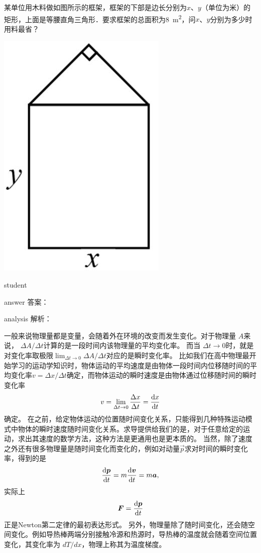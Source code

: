 \begin{example}
	某单位用木料做如图所示的框架，框架的下部是边长分别为$ x $、$ y $（单位为米）的矩形，上面是等腰直角三角形．要求框架的总面积为\SI{8}{m^2}，问$ x $、$ y $分别为多少时用料最省？
		\begin{flushright}
			\includegraphics[width=0.2\linewidth]{image/kinamatics-8.png}
		\end{flushright}
	
	\begin{taggedblock}{student}
		\vspace*{0cm}
	\end{taggedblock}
	
	
	\begin{taggedblock}{answer}
		答案：
	\end{taggedblock}
	
	
	\begin{taggedblock}{analysis}
		解析：
	\end{taggedblock}
\end{example}

一般来说物理量都是变量，会随着外在环境的改变而发生变化。对于物理量 $ A $来说， $ \Delta A/\Delta t $计算的是一段时间内该物理量的平均变化率。
而当 $ \Delta t\rightarrow 0 $时，就是对变化率取极限$ \lim_{\Delta t\rightarrow 0} \Delta A/\Delta t  $对应的是瞬时变化率。
比如我们在高中物理最开始学习的运动学知识时，物体运动的平均速度是由物体一段时间内位移随时间的平均变化率$ v=\Delta x/\Delta t $确定，而物体运动的瞬时速度是由物体通过位移随时间的瞬时变化率
\[
v = \lim_{\Delta t\rightarrow 0}\frac{\Delta x}{\Delta t} = \dv{x}{t}
\]
确定。
在之前，给定物体运动的位置随时间变化关系，只能得到几种特殊运动模式中物体的瞬时速度随时间变化关系。求导提供给我们的是，对于任意给定的运动，求出其速度的数学方法，这种方法是更通用也是更本质的。
当然，除了速度之外还有很多物理量是随时间变化而变化的，例如对动量$ \vec{p} $求对时间的瞬时变化率，得到的是
\[
\dv{\vb*{p}}{t} = m\dv{\vb*{v}}{t} = m\vb*{a},
\]
实际上
\[
\vb*{F} = \dv{\vb*{p}}{t}
\]
正是Newton第二定律的最初表达形式。
另外，物理量除了随时间变化，还会随空间变化。例如导热棒两端分别接触冷源和热源时，导热棒的温度就会随着空间位置变化，其变化率为 $ dT/dx $，物理上称其为温度梯度。

